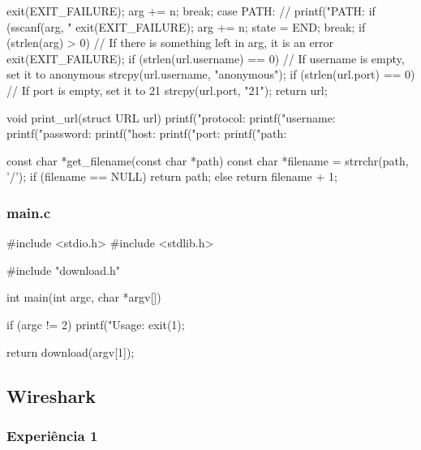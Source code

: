 \documentclass[11pt,a4paper]{article}
\begin{document}
\begin{c-darktheme}
{{{{                exit(EXIT_FAILURE);
            }
            arg += n;
            break;
        case PATH:
            // printf("PATH: %
            if (sscanf(arg, "%
            {
                exit(EXIT_FAILURE);
            }
            arg += n;
            state = END;
            break;
        }
    }
    if (strlen(arg) > 0) // If there is something left in arg, it is an error
    {
        exit(EXIT_FAILURE);
    }
    if (strlen(url.username) == 0) // If username is empty, set it to anonymous
    {
        strcpy(url.username, "anonymous");
    }
    if (strlen(url.port) == 0) // If port is empty, set it to 21
    {
        strcpy(url.port, "21");
    }
    return url;
}

void print_url(struct URL url)
{
    printf("protocol: %
    printf("username: %
    printf("password: %
    printf("host: %
    printf("port: %
    printf("path: %
}

const char *get_filename(const char *path)
{
    const char *filename = strrchr(path, '/');
    if (filename == NULL)
    {
        return path;
    }
    else
    {
        return filename + 1;
    }
}

\end{c-darktheme}

\subsubsection{main.c}
\begin{c-darktheme}
    #include <stdio.h>
#include <stdlib.h>

#include "download.h"

int main(int argc, char *argv[])
{
    if (argc != 2)
    {
        printf("Usage: %
        exit(1);
    }

    return download(argv[1]);
}
\end{c-darktheme}


\subsection{Wireshark}

\subsubsection{Experiência 1}
\end{document}
